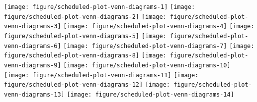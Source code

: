 \documentclass{article}\usepackage[]{graphicx}\usepackage[]{color}
\newenvironment{knitrout}{}{} %
\begin{document}
\begin{knitrout}
\color{fgcolor}

{\centering \texttt{[image: figure/scheduled-plot-venn-diagrams-1]} 
\texttt{[image: figure/scheduled-plot-venn-diagrams-2]} 
\texttt{[image: figure/scheduled-plot-venn-diagrams-3]} 
\texttt{[image: figure/scheduled-plot-venn-diagrams-4]} 
\texttt{[image: figure/scheduled-plot-venn-diagrams-5]} 
\texttt{[image: figure/scheduled-plot-venn-diagrams-6]} 
\texttt{[image: figure/scheduled-plot-venn-diagrams-7]} 
\texttt{[image: figure/scheduled-plot-venn-diagrams-8]} 
\texttt{[image: figure/scheduled-plot-venn-diagrams-9]} 
\texttt{[image: figure/scheduled-plot-venn-diagrams-10]} 
\texttt{[image: figure/scheduled-plot-venn-diagrams-11]} 
\texttt{[image: figure/scheduled-plot-venn-diagrams-12]} 
\texttt{[image: figure/scheduled-plot-venn-diagrams-13]} 
\texttt{[image: figure/scheduled-plot-venn-diagrams-14]} 

}



\end{knitrout}
\end{document}
